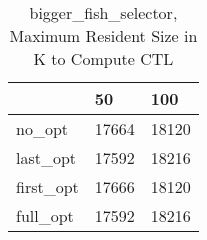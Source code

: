 \begin{table}
\caption{bigger\_fish\_selector, Maximum Resident Size in K to Compute CTL}
\label{bigger_fish_selector_CTL_size}
\begin{tabular}{lll}
\toprule
 & 50 & 100 \\
\midrule
no\_opt & 17664 & 18120 \\
last\_opt & 17592 & 18216 \\
first\_opt & 17666 & 18120 \\
full\_opt & 17592 & 18216 \\
\bottomrule
\end{tabular}
\end{table}
